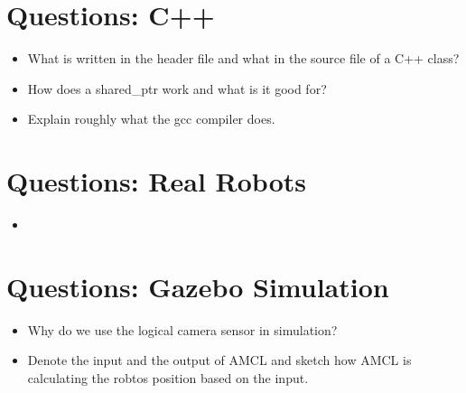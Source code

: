 \section{Questions: C++}
\label{sec:questions_c++}

\begin{itemize}
 \item What is written in the header file and what in the source file of a C++ class?
 \item How does a shared\_ptr work and what is it good for?
 \item Explain roughly what the gcc compiler does.
\end{itemize}

\section{Questions: Real Robots}
\label{sec:questions_robots}

\begin{itemize}
 \item 
\end{itemize}

\section{Questions: Gazebo Simulation}
\label{sec:questions_simulation}

\begin{itemize}
 \item Why do we use the logical camera sensor in simulation?
 \item Denote the input and the output of AMCL and sketch how AMCL is calculating the robtos position based on the input.
\end{itemize}
